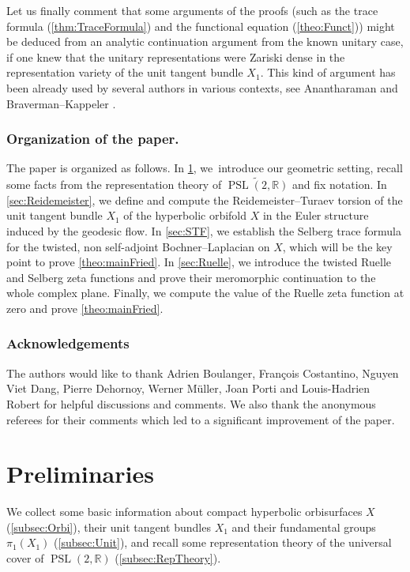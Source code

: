 \documentclass[10pt]{amsart}
\theoremstyle{plain}
\theoremstyle{definition}
\theoremstyle{remark}
\newcommand{\R}{\mathbb{R}}
\DeclareMathOperator{\PSL}{PSL}
\numberwithin{equation}{section}
\begin{document}
Let us finally comment that some arguments of the proofs (such as the trace formula (\cref{thm:TraceFormula}) and the functional equation (\cref{theo:Funct})) might be deduced from an analytic continuation argument from the known unitary case, if one knew that the unitary representations were Zariski dense in the representation variety of the unit tangent bundle $X_1$. This kind of argument has been already used by several authors in various contexts, see Anantharaman \cite{Anan} and Braverman--Kappeler \cite{BK}.

\subsubsection*{Organization of the paper.}
The paper is organized as follows.
In \cref{sec:Prel}, we~introduce our geometric setting, recall some facts from the representation theory
of $\widetilde{\PSL(2,\R)}$ and fix notation.
In \cref{sec:Reidemeister}, we define and compute the Reidemeister--Turaev torsion of the unit tangent bundle $X_1$ of the hyperbolic orbifold $X$ in the Euler structure induced by the geodesic flow. In \cref{sec:STF}, we establish the Selberg trace formula for the twisted, non self-adjoint Bochner--Laplacian on $X$,
which will be the key point to prove \cref{theo:mainFried}.
In \cref{sec:Ruelle}, we introduce the twisted Ruelle and Selberg zeta functions
and prove their meromorphic continuation to the whole complex plane.
Finally, we compute the value of the Ruelle zeta function at zero and
prove \cref{theo:mainFried}.

\subsubsection*{Acknowledgements}
The authors would like to thank Adrien Boulanger, François Costantino, Nguyen Viet Dang, Pierre Dehornoy, Werner Müller, Joan Porti and Louis-Hadrien Robert for helpful discussions and comments. We also thank the anonymous referees for their comments which led to a significant improvement of the paper.

\section{Preliminaries}
\label{sec:Prel}
We collect some basic information about compact hyperbolic orbisurfaces $X$ (\cref{subsec:Orbi}), their unit tangent bundles $X_1$ and their fundamental groups $\pi_1(X_1)$ (\cref{subsec:Unit}), and recall some representation theory of the universal cover of $\PSL(2,\R)$ (\cref{subsec:RepTheory}).
\end{document}
